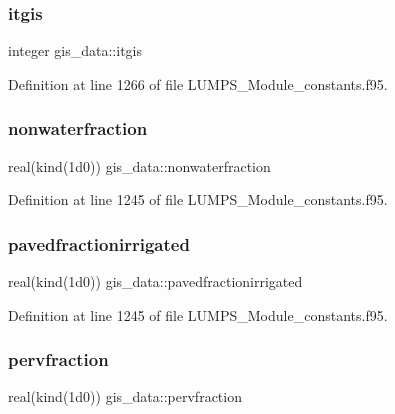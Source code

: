 \subsubsection{\texorpdfstring{itgis}{itgis}}
{\footnotesize\ttfamily integer gis\+\_\+data\+::itgis}



Definition at line 1266 of file L\+U\+M\+P\+S\+\_\+\+Module\+\_\+constants.\+f95.

\mbox{\label{namespacegis__data_a33f200820c4bd251ccc75f2cf5ca8f04}} 
\subsubsection{\texorpdfstring{nonwaterfraction}{nonwaterfraction}}
{\footnotesize\ttfamily real(kind(1d0)) gis\+\_\+data\+::nonwaterfraction}



Definition at line 1245 of file L\+U\+M\+P\+S\+\_\+\+Module\+\_\+constants.\+f95.

\mbox{\label{namespacegis__data_a1eb73d51311f9f34a225b59c614c4829}} 
\subsubsection{\texorpdfstring{pavedfractionirrigated}{pavedfractionirrigated}}
{\footnotesize\ttfamily real(kind(1d0)) gis\+\_\+data\+::pavedfractionirrigated}



Definition at line 1245 of file L\+U\+M\+P\+S\+\_\+\+Module\+\_\+constants.\+f95.

\mbox{\label{namespacegis__data_aafb1e051dfaaf0a04760dc14acf4b053}} 
\subsubsection{\texorpdfstring{pervfraction}{pervfraction}}
{\footnotesize\ttfamily real(kind(1d0)) gis\+\_\+data\+::pervfraction}



